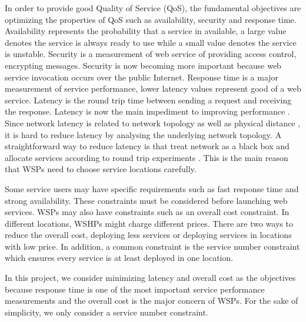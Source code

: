 In order to provide good Quality of Service (QoS), the fundamental objectives are optimizing the properties of QoS such as
availability, security and response time. Availability \cite{Kritikos} represents the probability that a service in available, a large value denotes the service is always ready to use while a small value denotes the service is unstable. Security \cite{Anisetti} is a measurement of web service of providing access control, encrypting messages. Security is now becoming more important because web service invocation occurs over the public Internet.
Response time is a major measurement of service performance, lower latency values represent good of a web service. Latency
is the round trip time between sending a request and receiving the response.  Latency is now the main impediment to improving performance \cite{Flach}. Since network latency is related to network topology
as well as physical distance \cite{distanceMetrics}, it is hard to reduce latency by analysing the underlying network topology.
A straightforward way to reduce latency is that treat network as a black box and allocate services according to round trip experiments \cite{cha2008design}. 
This is the main reason that WSPs need to choose service locations carefully.

Some service users may have specific requirements such as fast response time and strong availability. These constraints
 must be considered before launching web services. 
 WSPs may also have constraints such as an overall cost constraint. In different locations, 
 WSHPs might charge different prices. There are two ways to reduce the overall cost, deploying less
 services or deploying services in locations with low price.
 In addition, 
 a common constraint is the service number constraint which ensures every service is at least deployed in one location.

In this project, we consider minimizing latency and overall cost as the objectives because response time is one of the most important service performance measurements and the overall cost is the major concern of WSPs. For the sake of simplicity, we
only consider a service number constraint.


